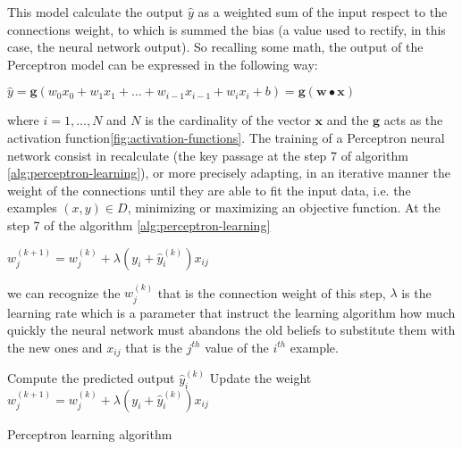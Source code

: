 This model calculate the output $\hat{y}$ as a weighted sum of the input respect to the connections weight, to which is summed the bias (a value used to rectify, in this case, the neural network output). So recalling some math, the output of the Perceptron model can be expressed in the following way:
\begin{center}
	$\hat{y} = \textbf{g}(w_{0}x_{0} + w_{1}x_{1} + \dots + w_{i-1}x_{i-1}  + w_{i}x_{i} + b  ) = \textbf{g}(\textbf{w} \bullet \textbf{x})$
\end{center}
where $i = 1, \dots, N$ and $N$ is the cardinality of the vector $\textbf{x}$ and the $\textbf{g}$ acts as the activation function\ref{fig:activation-functions}.
The training of a Perceptron neural network consist in recalculate (the key passage at the step 7 of algorithm \ref{alg:perceptron-learning}), or more precisely adapting, in an iterative manner the weight of the connections until they are able to fit the input data, i.e. the examples $(x, y) \in D$, minimizing or maximizing an objective function.
At the step 7 of the algorithm \ref{alg:perceptron-learning}
\begin{center}
	$w_{j}^{(k + 1)} = w_{j}^{(k)} + \lambda(y_{i} + \hat{y}_{i}^{(k)})x_{ij}$	
\end{center}
we can recognize the $w_{j}^{(k)}$ that is the connection weight of this step, $\lambda$ is the learning rate which is a parameter that instruct the learning algorithm how much quickly the neural network must abandons the old beliefs to substitute them with the new ones and $x_{ij}$ that is the $j^{th}$ value of the $i^{th}$ example.

\begin{algorithm}
	\begin{algorithmic}[1]
		\Repeat
				\State Compute the predicted output $\hat{y}_{i}^{(k)}$
					\State Update the weight $w_{j}^{(k + 1)} = w_{j}^{(k)} + \lambda(y_{i} + \hat{y}_{i}^{(k)})x_{ij}$
				\EndFor
			\EndFor
	\end{algorithmic}
	\caption{Perceptron learning algorithm \cite{ITDM:2014}}\label{alg:perceptron-learning}
\end{algorithm}

